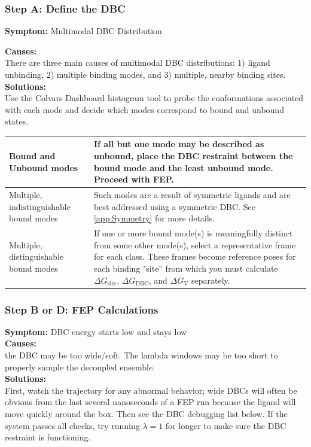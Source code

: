 \documentclass[9pt,tutorial]{Styling/livecoms}
\begin{document}
\subsubsection{Step A: Define the DBC}
\noindent\textbf{Symptom:}  Multimodal DBC Distribution

\textbf{Causes:}\\
There are three main causes of multimodal DBC distributions: 1) ligand unbinding, 2) multiple binding modes, and 3) multiple, nearby binding sites.\\ 
\textbf{Solutions:}\\
Use the Colvars Dashboard histogram tool to probe the conformations associated with each mode and decide which modes correspond to bound and unbound states. \\
\begin{tabular}{|p{3cm}|p{5cm}|}
    \hline
    \center Bound and Unbound modes & If all but one mode may be described as unbound, place the DBC restraint between the bound mode and the least unbound mode. Proceed with FEP. \\\hline
    \center Multiple, indistinguishable bound modes & Such modes are a result of symmetric ligands and are best addressed using a symmetric DBC. See \ref{app:Symmetry} for more details.\\\hline
    \center Multiple, distinguishable bound modes & If one or more bound mode(s) is meaningfully distinct from some other mode(s), select a representative frame for each class. These frames become reference poses for each binding "site'' from which you must calculate $\Delta G_\mathrm{site}$, $\Delta G_\mathrm{DBC}$, and $\Delta G_\mathrm{V}$ separately. \\\hline
\end{tabular}


\subsubsection{Step B or D: FEP Calculations}
\noindent\textbf{Symptom:}  DBC energy starts low and stays low\\
\textbf{Causes:}\\
the DBC may be too wide/soft. The lambda windows may be too short to properly sample the decoupled ensemble.\\
\textbf{Solutions:}\\
First, watch the trajectory for any abnormal behavior; wide DBCs will often be obvious from the last several nanoseconds of a FEP run because the ligand will move quickly around the box. Then see the DBC debugging list below. If the system passes all checks, try running $\lambda=1$ for longer to make sure the DBC restraint is functioning.\\
\end{document}
